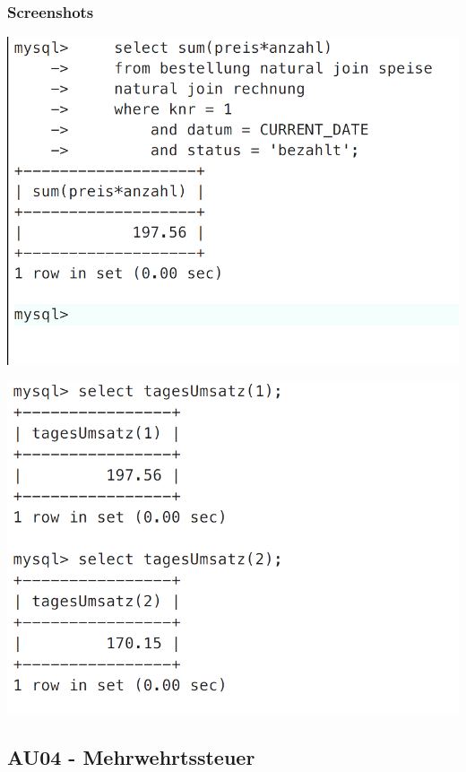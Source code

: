 \subsubsection{Screenshots}
\vspace{0.2cm}
\begin{minipage}{.5\textwidth}
	\includegraphics[width=1\linewidth]{images/s05.png}
\end{minipage}%
\begin{minipage}{.5\textwidth}
	\includegraphics[width=1\linewidth]{images/s06.png}
\end{minipage}

\clearpage

\subsection{AU04 - Mehrwehrtssteuer}
